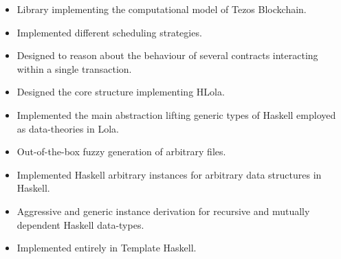     \begin{itemize}
        \item Library implementing the computational model of Tezos Blockchain.
        \item Implemented different scheduling strategies.
        \item Designed to reason about the behaviour of several contracts
            interacting within a single transaction.
    \end{itemize}
    \divider

    \begin{itemize}
        \item Designed the core structure implementing HLola.
        \item Implemented the main abstraction lifting generic types of Haskell
employed as data-theories in Lola.
    \end{itemize}
    \divider

    \begin{itemize}
        \item Out-of-the-box fuzzy generation of arbitrary files.
        \item Implemented Haskell arbitrary instances for arbitrary data
                structures in Haskell.
    \end{itemize}
    \divider

    \begin{itemize}
        \item Aggressive and generic instance derivation for recursive and
            mutually dependent Haskell data-types.
        \item Implemented entirely in Template Haskell.
    \end{itemize}

